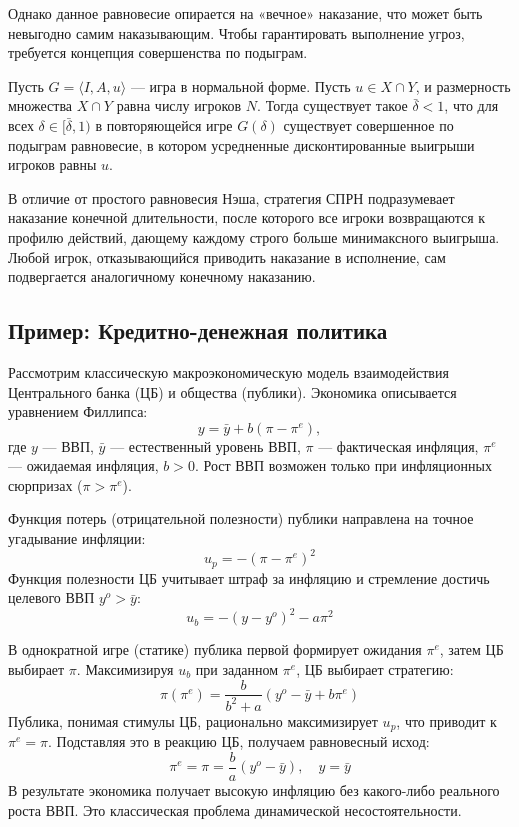 Однако данное равновесие опирается на «вечное» наказание, что может быть невыгодно самим наказывающим. Чтобы гарантировать выполнение угроз, требуется концепция совершенства по подыграм.

\begin{theorem}
Пусть $G = \langle I, A, u \rangle$ — игра в нормальной форме. Пусть $u \in X \cap Y$, и размерность множества $X \cap Y$ равна числу игроков $N$. Тогда существует такое $\bar{\delta} < 1$, что для всех $\delta \in [\bar{\delta}, 1)$ в повторяющейся игре $G(\delta)$ существует совершенное по подыграм равновесие, в котором усредненные дисконтированные выигрыши игроков равны $u$.
\end{theorem}

В отличие от простого равновесия Нэша, стратегия СПРН подразумевает наказание конечной длительности, после которого все игроки возвращаются к профилю действий, дающему каждому строго больше минимаксного выигрыша. Любой игрок, отказывающийся приводить наказание в исполнение, сам подвергается аналогичному конечному наказанию.

\subsection{Пример: Кредитно-денежная политика}

Рассмотрим классическую макроэкономическую модель взаимодействия Центрального банка (ЦБ) и общества (публики).
Экономика описывается уравнением Филлипса:
\begin{equation}
    y = \bar{y} + b(\pi - \pi^e),
\end{equation}
где $y$ — ВВП, $\bar{y}$ — естественный уровень ВВП, $\pi$ — фактическая инфляция, $\pi^e$ — ожидаемая инфляция, $b > 0$. Рост ВВП возможен только при инфляционных сюрпризах ($\pi > \pi^e$).

Функция потерь (отрицательной полезности) публики направлена на точное угадывание инфляции:
\begin{equation}
    u_p = -(\pi - \pi^e)^2
\end{equation}
Функция полезности ЦБ учитывает штраф за инфляцию и стремление достичь целевого ВВП $y^o > \bar{y}$:
\begin{equation}
    u_b = -(y - y^o)^2 - a\pi^2
\end{equation}

В однократной игре (статике) публика первой формирует ожидания $\pi^e$, затем ЦБ выбирает $\pi$. Максимизируя $u_b$ при заданном $\pi^e$, ЦБ выбирает стратегию:
\begin{equation}
    \pi(\pi^e) = \frac{b}{b^2 + a}(y^o - \bar{y} + b\pi^e)
\end{equation}
Публика, понимая стимулы ЦБ, рационально максимизирует $u_p$, что приводит к $\pi^e = \pi$. Подставляя это в реакцию ЦБ, получаем равновесный исход:
\begin{equation}
    \pi^e = \pi = \frac{b}{a}(y^o - \bar{y}), \quad y = \bar{y}
\end{equation}
В результате экономика получает высокую инфляцию без какого-либо реального роста ВВП. Это классическая проблема динамической несостоятельности.

